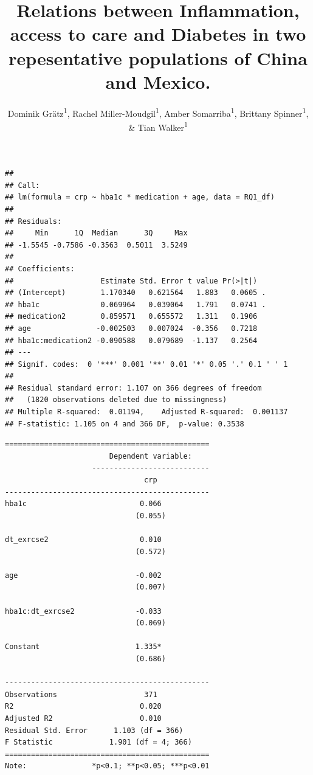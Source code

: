 \documentclass[
  man,floatsintext]{apa6}
\title{Relations between Inflammation, access to care and Diabetes in two repesentative populations of China and Mexico.}
\author{Dominik Grätz\textsuperscript{1}, Rachel Miller-Moudgil\textsuperscript{1}, Amber Somarriba\textsuperscript{1}, Brittany Spinner\textsuperscript{1}, \& Tian Walker\textsuperscript{1}}
\date{}
\affiliation{\vspace{0.5cm}\textsuperscript{1} University of Oregon}
\begin{document}
\maketitle

\begin{verbatim}
## 
## Call:
## lm(formula = crp ~ hba1c * medication + age, data = RQ1_df)
## 
## Residuals:
##     Min      1Q  Median      3Q     Max 
## -1.5545 -0.7586 -0.3563  0.5011  3.5249 
## 
## Coefficients:
##                    Estimate Std. Error t value Pr(>|t|)  
## (Intercept)        1.170340   0.621564   1.883   0.0605 .
## hba1c              0.069964   0.039064   1.791   0.0741 .
## medication2        0.859571   0.655572   1.311   0.1906  
## age               -0.002503   0.007024  -0.356   0.7218  
## hba1c:medication2 -0.090588   0.079689  -1.137   0.2564  
## ---
## Signif. codes:  0 '***' 0.001 '**' 0.01 '*' 0.05 '.' 0.1 ' ' 1
## 
## Residual standard error: 1.107 on 366 degrees of freedom
##   (1820 observations deleted due to missingness)
## Multiple R-squared:  0.01194,    Adjusted R-squared:  0.001137 
## F-statistic: 1.105 on 4 and 366 DF,  p-value: 0.3538
\end{verbatim}

\begin{verbatim}
===============================================
                        Dependent variable:    
                    ---------------------------
                                crp            
-----------------------------------------------
hba1c                          0.066           
                              (0.055)          
                                               
dt_exrcse2                     0.010           
                              (0.572)          
                                               
age                           -0.002           
                              (0.007)          
                                               
hba1c:dt_exrcse2              -0.033           
                              (0.069)          
                                               
Constant                      1.335*           
                              (0.686)          
                                               
-----------------------------------------------
Observations                    371            
R2                             0.020           
Adjusted R2                    0.010           
Residual Std. Error      1.103 (df = 366)      
F Statistic             1.901 (df = 4; 366)    
===============================================
Note:               *p<0.1; **p<0.05; ***p<0.01
\end{verbatim}
\end{document}
